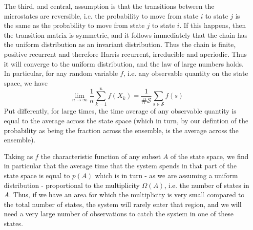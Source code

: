\documentclass[a4paper, draft]{report}
\numberwithin{section}{chapter}
\numberwithin{equation}{chapter}
\theoremstyle{own}
\theoremstyle{remark}
\begin{document}
The third, and central, assumption is that the transitions between the microstates are reversible, i.e. the probability to move from state $i$ to state $j$ is the same as the probability to move from state $j$ to state $i$. If this happens, then the transition matrix is symmetric, and it follows immediately that the chain has the uniform distribution as an invariant distribution. Thus the chain is finite, positive recurrent and therefore Harris recurrent, irreducible and aperiodic. Thus it will converge to the uniform distribution, and the law of large numbers holds. In particular, for any random variable $f$, i.e. any observable quantity on the state space, we have 
$$
\lim_{n \rightarrow \infty} \frac{1}{n} \sum_{k=1}^n f(X_k) = 
\frac{1}{\#{\mathcal S}} \sum_{s \in {\mathcal S}} f(s)
$$
Put differently, for large times, the time average of any observable quantity is equal to the average across the state space (which in turn, by our defintion of the probability as being the fraction across the ensemble, is the average across the ensemble).

Taking as $f$ the characteristic function of any subset $A$ of the state space, we find in particular that the average time that the system spends in that part of the state space is equal to $p(A)$ which is in turn - as we are assuming a uniform distribution - proportional to the multiplicity $\Omega(A)$, i.e. the number of states in $A$. Thus, if we have an area for which the multiplicity is very small compared to the total number of states, the system will rarely enter that region, and we will need a very large number of observations to catch the system in one of these states.
\end{document}
